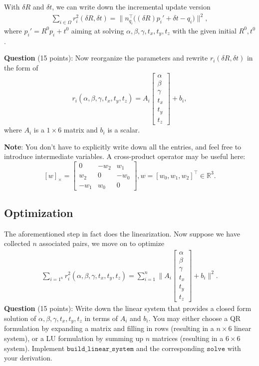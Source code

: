 \documentclass[12pt, a4paper]{article}
\begin{document}
With $\delta R$ and $\delta t$, we can write down the incremental update version
\begin{align}
	\sum_{i \in \Omega} r_i^2(\delta R, \delta t) = \bigg\lVert n_{q_i}^\top \bigg((\delta R) p_i' + \delta t - q_i \bigg)\bigg\rVert^2,
\end{align}
where $p_i' = R^0 p_i + t^0$ aiming at solving $\alpha, \beta, \gamma, t_x, t_y, t_z$ with the given initial $R^0, t^0$.

\textbf{Question} (15 points): Now reorganize the parameters and rewrite $r_i(\delta R, \delta t)$ in the form of
$$
	r_i(\alpha, \beta, \gamma, t_x, t_y, t_z) = A_i \begin{bmatrix}
		\alpha \\ \beta \\ \gamma \\ t_x \\ t_y \\ t_z
	\end{bmatrix} + b_i,
$$
where $A_i$ is a $1 \times 6$ matrix and $b_i$ is a scalar.

\textbf{Note}: You don't have to explicitly write down all the entries, and feel free to introduce intermediate variables. A cross-product operator may be useful here:
$$
	[w]_\times = \begin{bmatrix}
		0    & -w_2 & w_1  \\
		w_2  & 0    & -w_0 \\
		-w_1 & w_0  & 0
	\end{bmatrix}, w = [w_0, w_1, w_2]^\top \in \mathbb{R}^3.
$$

\subsection{Optimization}
The aforementioned step in fact does the linearization. Now suppose we have collected $n$ associated pairs, we move on to optimize
\begin{align}
	\sum_{i=1^n} r_i^2(\alpha, \beta, \gamma, t_x, t_y, t_z) = \sum_{i=1}^n \bigg\lVert A_i \begin{bmatrix}
		\alpha \\ \beta \\ \gamma \\ t_x \\ t_y \\ t_z
	\end{bmatrix} + b_i\bigg\rVert^2.
\end{align}
\textbf{Question} (15 points): Write down the linear system that provides a closed form solution of $\alpha, \beta, \gamma, t_x, t_y, t_z$  in terms of $A_i$ and $b_i$. You may either choose a QR formulation by expanding a matrix and filling in rows (resulting in a $n \times 6$ linear system), or a LU formulation by summing up $n$ matrices (resulting in a $6 \times 6$ system). Implement $\mathtt{build\_linear\_system}$ and the corresponding $\mathtt{solve}$ with your derivation.
\end{document}
